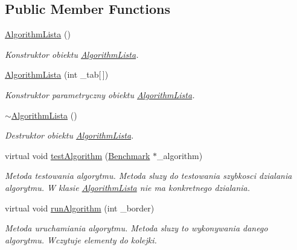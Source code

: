 \subsection*{Public Member Functions}
\begin{DoxyCompactItemize}
\item 
\hyperlink{class_algorithm_lista_a4c7749379de38154982288419f305141}{Algorithm\+Lista} ()
\begin{DoxyCompactList}\small\item\em Konstruktor obiektu \hyperlink{class_algorithm_lista}{Algorithm\+Lista}. \end{DoxyCompactList}\item 
\hyperlink{class_algorithm_lista_ab5aed5527ca4f27c213e97fa19f6e32d}{Algorithm\+Lista} (int \+\_\+tab\mbox{[}$\,$\mbox{]})
\begin{DoxyCompactList}\small\item\em Konstruktor parametryczny obiektu \hyperlink{class_algorithm_lista}{Algorithm\+Lista}. \end{DoxyCompactList}\item 
\hyperlink{class_algorithm_lista_a2d7c5ef95cdfe523a86b01da06d0fb2e}{$\sim$\+Algorithm\+Lista} ()
\begin{DoxyCompactList}\small\item\em Destruktor obiektu \hyperlink{class_algorithm_lista}{Algorithm\+Lista}. \end{DoxyCompactList}\item 
virtual void \hyperlink{class_algorithm_lista_a1e1f93e75b4a635098bf30ec32f19903}{test\+Algorithm} (\hyperlink{class_benchmark}{Benchmark} $\ast$\+\_\+algorithm)
\begin{DoxyCompactList}\small\item\em Metoda testowania algorytmu. Metoda sluzy do testowania szybkosci dzialania algorytmu. W klasie \hyperlink{class_algorithm_lista}{Algorithm\+Lista} nie ma konkretnego dzialania. \end{DoxyCompactList}\item 
virtual void \hyperlink{class_algorithm_lista_a5c41dbbd3ae7a9ac34edec1a51bc8eb1}{run\+Algorithm} (int \+\_\+border)
\begin{DoxyCompactList}\small\item\em Metoda uruchamiania algorytmu. Metoda sluzy to wykonywania danego algorytmu. Wczytuje elementy do kolejki. \end{DoxyCompactList}\end{DoxyCompactItemize}

